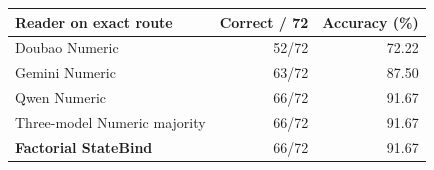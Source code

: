 \begin{tabular}{lrr}
\toprule
Reader on exact route & Correct / 72 & Accuracy (\%) \\
\midrule
Doubao Numeric & 52/72 & 72.22 \\
Gemini Numeric & 63/72 & 87.50 \\
Qwen Numeric & 66/72 & 91.67 \\
Three-model Numeric majority & 66/72 & 91.67 \\
\textbf{Factorial StateBind} & 66/72 & 91.67 \\
\bottomrule
\end{tabular}
